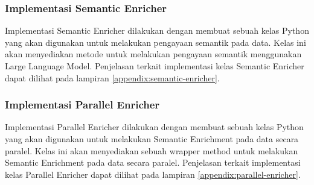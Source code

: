 \subsubsection{Implementasi Semantic Enricher}

Implementasi Semantic Enricher dilakukan dengan membuat sebuah kelas Python yang akan digunakan untuk melakukan pengayaan semantik pada data. Kelas ini akan menyediakan metode untuk melakukan pengayaan semantik menggunakan Large Language Model. Penjelasan terkait implementasi kelas Semantic Enricher dapat dilihat pada lampiran \ref{appendix:semantic-enricher}.

\subsubsection{Implementasi Parallel Enricher}

Implementasi Parallel Enricher dilakukan dengan membuat sebuah kelas Python yang akan digunakan untuk melakukan Semantic Enrichment pada data secara paralel. Kelas ini akan menyediakan sebuah wrapper method untuk melakukan Semantic Enrichment pada data secara paralel. Penjelasan terkait implementasi kelas Parallel Enricher dapat dilihat pada lampiran \ref{appendix:parallel-enricher}.



